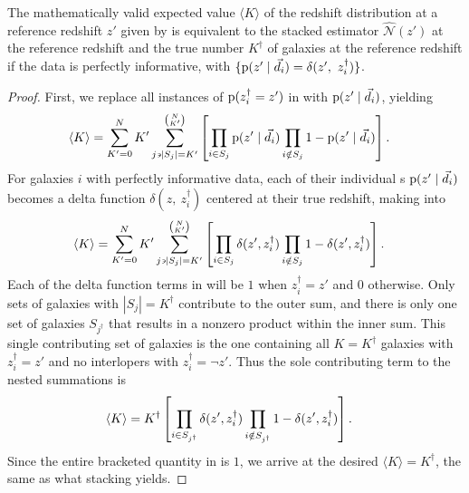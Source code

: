 \begin{theorem}
	\label{thm:informative}
	The mathematically valid expected value $\langle K \rangle$ of the redshift distribution at a reference redshift $z'$ given by  is equivalent to the stacked estimator $\hat{\mathcal{N}}(z')$ at the reference redshift and the true number $K^{\dagger}$ of galaxies at the reference redshift if the data is perfectly informative, with ${\{\mathrm{p}(z' \mid \vec{d}_{i}) = \delta(z',\ z^{\dagger}_{i})\}}$.
\end{theorem}
\begin{proof}
	First, we replace all instances of ${\mathrm{p}(z_{i}^{\dagger} = z')}$ in  with $\mathrm{p}(z' \mid \vec{d}_{i})$, yielding
	\begin{align}
	\eqlabel{eqn:proofwithdata1}
	    \langle K \rangle &= \sum_{K' = 0}^{N} K' \sum_{j \backepsilon |S_{j}|=K'}^{\binom{N}{K'}} \left[ \prod_{i \in S_{j}} \pr{z' \gvn \data_{i}} \prod_{i \notin S_{j}} 1 - \pr{z' \gvn \data_{i}} \right] .
	\end{align}
	For galaxies $i$ with perfectly informative data, each of their individual \pzpdf s ${\mathrm{p}(z' \mid \vec{d}_{i})}$ becomes a delta function $\delta(z,\ z^{\dagger}_{i})$ centered at their true redshift, making  into
	\begin{align}
	\eqlabel{eqn:proofwithdata2}
	    \langle K \rangle &= \sum_{K' = 0}^{N} K' \sum_{j \backepsilon |S_{j}| = K'}^{\binom{N}{K'}} \left[ \prod_{i \in S_{j}} \delta(z', z^{\dagger}_{i}) \prod_{i \notin S_{j}} 1 - \delta(z', z^{\dagger}_{i}) \right] .
	\end{align}
	Each of the delta function terms in  will be $1$ when ${z^{\dagger}_{i} = z'}$ and $0$ otherwise.
	Only sets of galaxies with ${|S_{j}| = K^{\dagger}}$ contribute to the outer sum, and there is only one set of galaxies $S_{j^{\dagger}}$ that results in a nonzero product within the inner sum.
	This single contributing set of galaxies is the one containing all ${K = K^{\dagger}}$ galaxies with ${z^{\dagger}_{i} = z'}$ and no interlopers with ${z^{\dagger}_{i} = \lnot z'}$.
	Thus the sole contributing term to the nested summations is
	\begin{align}
	\eqlabel{eqn:proofwithdata3}
	    \langle K \rangle &= K^{\dagger} \left[ \prod_{i \in S_{j^{\dagger}}} \delta(z', z^{\dagger}_{i}) \prod_{i \notin S_{j^{\dagger}}} 1 - \delta(z', z^{\dagger}_{i}) \right] .
	\end{align}
	Since the entire bracketed quantity in  is $1$, we arrive at the desired ${\langle K \rangle = K^{\dagger}}$, the same as what stacking yields.
\end{proof}

